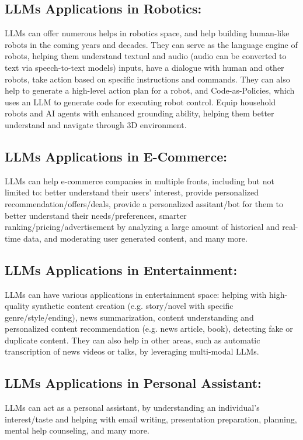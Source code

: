 \documentclass[conference]{IEEEtran}
\begin{document}
\subsection{LLMs Applications in Robotics:}
LLMs can offer numerous helps in robotics space, and help building human-like robots in the coming years and decades. 
They can serve as the language engine of robots, helping them understand textual and audio (audio can be converted to text via speech-to-text models) inputs, have a dialogue with human and other robots, take action based on specific instructions and commands.  
They can also help to generate a high-level action plan for a robot, and Code-as-Policies, which uses an LLM to generate code for executing robot control.
Equip household robots and AI agents with enhanced grounding ability, helping them better understand and navigate through 3D environment.

\subsection{LLMs Applications in E-Commerce:}
LLMs can help e-commerce companies in multiple fronts, including but not limited to: better understand their users' interest, provide personalized recommendation/offers/deals, provide a personalized assitant/bot for them to better understand their needs/preferences, smarter ranking/pricing/advertisement by analyzing a large amount of historical and real-time data, and moderating user generated content, and many more.

\subsection{LLMs Applications in Entertainment:}
LLMs can have various applications in entertainment space: helping with high-quality synthetic content creation (e.g. story/novel with specific genre/style/ending), news summarization, content understanding and personalized content recommendation (e.g. news article, book), detecting fake or duplicate content. 
They can also help in other areas, such as automatic transcription of news videos or talks, by leveraging multi-modal LLMs.

\subsection{LLMs Applications in Personal Assistant:}
LLMs can act as a personal assistant, by understanding an individual's interest/taste and helping with email writing, presentation preparation, planning, mental help counseling, and many more.
\end{document}
